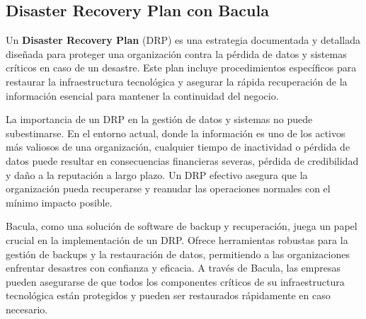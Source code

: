 
\subsection{Disaster Recovery Plan con Bacula}

Un \textbf{Disaster Recovery Plan} (DRP) es una estrategia documentada y detallada diseñada para proteger una organización contra la pérdida de datos y sistemas críticos en caso de un desastre. Este plan incluye procedimientos específicos para restaurar la infraestructura tecnológica y asegurar la rápida recuperación de la información esencial para mantener la continuidad del negocio.

La importancia de un DRP en la gestión de datos y sistemas no puede subestimarse. En el entorno actual, donde la información es uno de los activos más valiosos de una organización, cualquier tiempo de inactividad o pérdida de datos puede resultar en consecuencias financieras severas, pérdida de credibilidad y daño a la reputación a largo plazo. Un DRP efectivo asegura que la organización pueda recuperarse y reanudar las operaciones normales con el mínimo impacto posible.

Bacula, como una solución de software de backup y recuperación, juega un papel crucial en la implementación de un DRP. Ofrece herramientas robustas para la gestión de backups y la restauración de datos, permitiendo a las organizaciones enfrentar desastres con confianza y eficacia. A través de Bacula, las empresas pueden asegurarse de que todos los componentes críticos de su infraestructura tecnológica están protegidos y pueden ser restaurados rápidamente en caso necesario.
